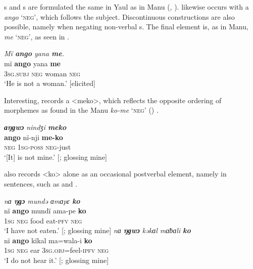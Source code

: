 
  s and s are formulated the same in Yaul as in Manu (, ).  likewise occurs with a  \textit{ango} ‘\textsc{neg}’, which follows the subject. Discontinuous  constructions are also possible, namely when  negating  non-verbal s. The final element is, as in Manu, \textit{me} ‘\textsc{neg}’, as seen in .

\ea%
    \label{ex:mdy:17}
          \textit{Mï \textbf{ango} yana \textbf{me}.}\\
    \gll mï      \textbf{ango}  yana    \textbf{me}\\
    3\textsc{sg.subj}  \textsc{neg}  woman    \textsc{neg}\\
    \glt ‘He is not a woman.’ [elicited]
\z

Interesting, \citet{Laycock1971a} records a  <meko>, which reflects the opposite ordering of morphemes as found in the Manu  \textit{ko-me} ‘\textsc{neg}’ () .

\ea%
    \label{ex:mdy:18}
          \textit{\textbf{ɑŋɡwɔ} nindʒi \textbf{meko}}\\
    \gll \textbf{ango}  nï-nji    \textbf{me-ko}\\
    \textsc{neg}  1\textsc{sg-poss}  \textsc{neg}{}-just\\
    \glt ‘[It] is not mine.’ [\citep[3262]{Laycock1971a}; glossing mine]
\z

\citet{Laycock1971a} also records <ko> alone as an occasional postverbal element, namely in   sentences, such as  and .

\ea%
    \label{ex:mdy:19}
          \textit{nɑ \textbf{ŋɡɔ} mundə ɑmɑpɛ \textbf{ko}}\\
    \gll nï    \textbf{ango}  mundï  ama-pe    \textbf{ko}\\
    1\textsc{sg}  \textsc{neg}  food  eat-\textsc{pfv}  \textsc{neg}\\
    \glt ‘I have not eaten.’ [\citep[3246]{Laycock1971a}; glossing mine]
\z
\ea%
    \label{ex:mdy:20}
          \textit{nɑ \textbf{ŋɡwɔ} kəkɑl mɑƀɑli \textbf{ko}}\\
    \gll nï    \textbf{ango}  kïkal  ma=wala{}-i      \textbf{ko}\\
    1\textsc{sg}  \textsc{neg}  ear    3\textsc{sg.obj}=feel-\textsc{ipfv}  \textsc{neg}\\
    \glt ‘I do not hear it.’ [\citep[3258]{Laycock1971a}; glossing mine]
\z

